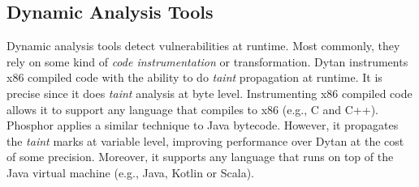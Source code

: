\subsection{Dynamic Analysis Tools} 
Dynamic analysis tools detect vulnerabilities at runtime. Most commonly, they rely on some kind of \textit{code instrumentation} or transformation. Dytan \cite{dytan} instruments x86 compiled code with the ability to do \textit{taint} propagation at runtime. It is precise since it does \textit{taint} analysis at byte level. Instrumenting x86 compiled code allows it to support any language that compiles to x86 (e.g., C and C++). Phosphor \cite{phosphor} applies a similar technique to Java bytecode. However, it propagates the \textit{taint} marks at variable level, improving performance over Dytan at the cost of some precision. Moreover, it supports any language that runs on top of the Java virtual machine (e.g., Java, Kotlin or Scala).

